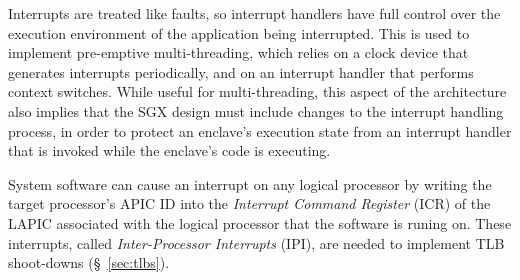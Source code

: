 Interrupts are treated like faults, so interrupt handlers have full control
over the execution environment of the application being interrupted. This is
used to implement pre-emptive multi-threading, which relies on a clock device
that generates interrupts periodically, and on an interrupt handler that
performs context switches. While useful for multi-threading, this aspect of the
architecture also implies that the SGX design must include changes to the
interrupt handling process, in order to protect an enclave's execution state
from an interrupt handler that is invoked while the enclave's code is
executing.

System software can cause an interrupt on any logical processor by writing the
target processor's APIC ID into the \textit{Interrupt Command Register} (ICR)
of the LAPIC associated with the logical processor that the software is runing
on. These interrupts, called \textit{Inter-Processor Interrupts} (IPI), are
needed to implement TLB shoot-downs (\S~\ref{sec:tlbs}).
